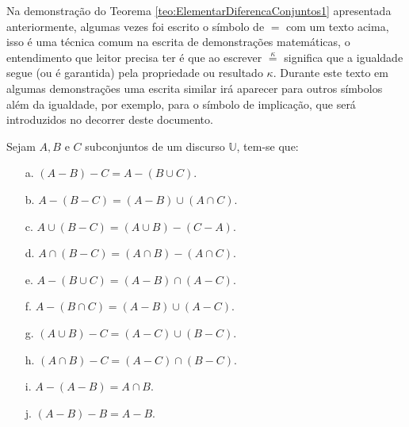 \begin{nota}
  Na demonstração do Teorema \ref{teo:ElementarDiferencaConjuntos1} apresentada anteriormente, algumas vezes foi escrito o símbolo de $=$ com um texto acima, isso é uma técnica comum na escrita de demonstrações matemáticas, o entendimento que leitor precisa ter é que ao escrever $\stackrel{\kappa}{=}$ significa que a igualdade segue (ou é garantida) pela propriedade ou resultado $\kappa$. Durante este texto em algumas demonstrações uma escrita similar irá aparecer para outros símbolos além da igualdade, por exemplo, para o símbolo de implicação, que será introduzidos no decorrer deste documento.
\end{nota}

\begin{teorema}\label{teo:ElementarDiferencaConjuntos2}
	Sejam $A, B$ e $C$ subconjuntos de um discurso $\mathbb{U}$, tem-se que:
	\begin{itemize}
		\item[a.] $(A - B) - C = A - (B \cup C)$.
		\item[b.] $A - (B - C) = (A - B) \cup (A \cap C)$.
		\item[c.] $A \cup (B - C) = (A \cup B) - (C - A)$.
		\item[d.] $A \cap (B - C) = (A \cap B) - (A \cap C)$.
		\item[e.] $A - (B \cup C) = (A - B) \cap (A - C)$.
		\item[f.] $A - (B \cap C) = (A - B) \cup (A - C)$.
		\item[g.] $(A \cup B) - C = (A - C) \cup (B - C)$.
		\item[h.] $(A \cap B) - C = (A - C) \cap (B - C)$.
		\item[i.] $A - (A - B) = A \cap B$.
		\item[j.] $(A - B) - B = A - B$.
	\end{itemize}
\end{teorema}

